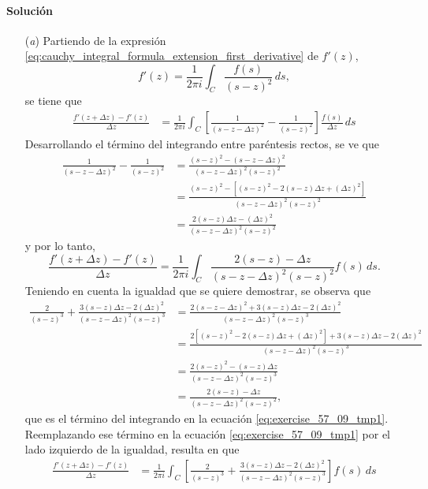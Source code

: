 \documentclass[a4paper]{report}
\begin{document}
\paragraph{Solución} 
\begin{enumerate}
 \item[(\textit{a})] Partiendo de la expresión \ref{eq:cauchy_integral_formula_extension_first_derivative} de \(f'(z)\),
 \[
  f'(z)=\frac{1}{2\pi i}\int_C\frac{f(s)}{(s-z)^2}\,ds, 
 \]
 se tiene que
 \begin{align*}
  \frac{f'(z+\Delta z)-f'(z)}{\Delta z}&=\frac{1}{2\pi i}\int_C\left[\frac{1}{(s-z-\Delta z)^2}-\frac{1}{(s-z)^2}\right]\frac{f(s)}{\Delta z}\,ds
 \end{align*}
 Desarrollando el término del integrando entre paréntesis rectos, se ve que 
 \begin{align*}
  \frac{1}{(s-z-\Delta z)^2}-\frac{1}{(s-z)^2}&=\frac{(s-z)^2-(s-z-\Delta z)^2}{(s-z-\Delta z)^2(s-z)^2}\\
   &=\frac{(s-z)^2-\left[(s-z)^2-2(s-z)\Delta z+(\Delta z)^2\right]}{(s-z-\Delta z)^2(s-z)^2}\\
   &=\frac{2(s-z)\Delta z-(\Delta z)^2}{(s-z-\Delta z)^2(s-z)^2}
 \end{align*}
 y por lo tanto,
 \begin{equation}\label{eq:exercise_57_09_tmp1}
  \frac{f'(z+\Delta z)-f'(z)}{\Delta z}=\frac{1}{2\pi i}\int_C\frac{2(s-z)-\Delta z}{(s-z-\Delta z)^2(s-z)^2}f(s)\,ds.  
 \end{equation}
 Teniendo en cuenta la igualdad que se quiere demostrar, se observa que 
 \begin{align*}
  \frac{2}{(s-z)^3}+\frac{3(s-z)\Delta z-2(\Delta z)^2}{(s-z-\Delta z)^2(s-z)^3}&=\frac{2(s-z-\Delta z)^2+3(s-z)\Delta z-2(\Delta z)^2}{(s-z-\Delta z)^2(s-z)^3}\\
  &=\frac{2\left[(s-z)^2-2(s-z)\Delta z+(\Delta z)^2\right]+3(s-z)\Delta z-2(\Delta z)^2}{(s-z-\Delta z)^2(s-z)^3}\\
  &=\frac{2(s-z)^2-(s-z)\Delta z}{(s-z-\Delta z)^2(s-z)^3}\\
  &=\frac{2(s-z)-\Delta z}{(s-z-\Delta z)^2(s-z)^2},
 \end{align*}
 que es el término del integrando en la ecuación \ref{eq:exercise_57_09_tmp1}. Reemplazando ese término en la ecuación \ref{eq:exercise_57_09_tmp1} por el lado izquierdo de la igualdad, resulta en que 
 \begin{align*}
  \frac{f'(z+\Delta z)-f'(z)}{\Delta z}&=\frac{1}{2\pi i}\int_C\left[\frac{2}{(s-z)^3}+\frac{3(s-z)\Delta z-2(\Delta z)^2}{(s-z-\Delta z)^2(s-z)^3}\right]f(s)\,ds\\

\end{align*}
\end{enumerate}
\end{document}
